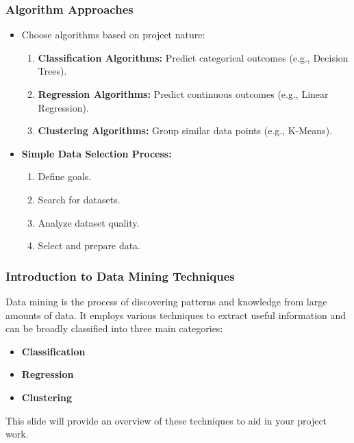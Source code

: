 \documentclass{beamer}
\begin{document}
\begin{frame}[fragile]
    \frametitle{Algorithm Approaches}
    \begin{itemize}
        \item Choose algorithms based on project nature:
        \begin{enumerate}
            \item \textbf{Classification Algorithms:} Predict categorical outcomes (e.g., Decision Trees).
            \item \textbf{Regression Algorithms:} Predict continuous outcomes (e.g., Linear Regression).
            \item \textbf{Clustering Algorithms:} Group similar data points (e.g., K-Means).
        \end{enumerate}
        \item \textbf{Simple Data Selection Process:}
        \begin{enumerate}
            \item Define goals.
            \item Search for datasets.
            \item Analyze dataset quality.
            \item Select and prepare data.
        \end{enumerate}
    \end{itemize}
\end{frame}

\begin{frame}[fragile]
    \titlepage
\end{frame}

\begin{frame}[fragile]
    \frametitle{Introduction to Data Mining Techniques}
    Data mining is the process of discovering patterns and knowledge from large amounts of data. It employs various techniques to extract useful information and can be broadly classified into three main categories:
    \begin{itemize}
        \item \textbf{Classification}
        \item \textbf{Regression}
        \item \textbf{Clustering}
    \end{itemize}
    This slide will provide an overview of these techniques to aid in your project work.
\end{frame}
\end{document}
